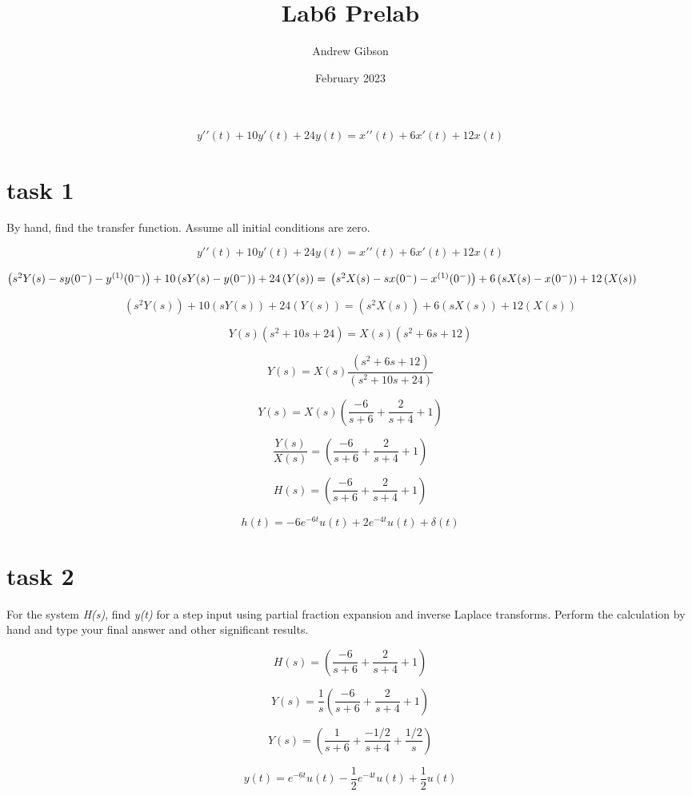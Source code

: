 \documentclass{article}
\title{Lab6 Prelab}
\author{Andrew Gibson}
\date{February 2023}
\begin{document}
\maketitle

\[y\prime \prime (t) + 10y\prime(t) + 24y(t) = x\prime\prime(t) + 6x\prime(t) + 12x(t)\]

\section{task 1}
By hand, find the transfer function. Assume all initial conditions are zero.

\[y\prime \prime (t) + 10y\prime(t) + 24y(t) = x\prime\prime(t) + 6x\prime(t) + 12x(t)\]

\begin{math}
\left(s^2 Y(s) -s y(0^{-})-y^{(1)} (0^{-}) \right) + 10 \left(s Y(s) - y(0^{-}) \right) + 24 \left(Y(s) \right)  = \\
\left(s^2 X(s) -s x(0^{-})-x^{(1)} (0^{-}) \right) + 6\left(s X(s) - x(0^{-}) \right) + 12 \left(X(s) \right) 
\end{math}

\[\left(s^2 Y(s) \right) + 10 \left(s Y(s) \right) + 24 \left(Y(s) \right) = \left(s^2 X(s) \right) + 6\left(s X(s) \right) + 12 \left(X(s) \right)\]

\[Y(s) \left(s^2 + 10 s  + 24 \right) =  X(s) \left(s^2  + 6 s + 12 \right)\]

\[Y(s)  =  X(s) \frac{\left(s^2  + 6 s + 12 \right)} {\left(s^2 + 10 s  + 24 \right)}\]

\[Y(s)  =  X(s) \left( \frac {-6} {s+6} + \frac {2}{s+4} + 1\right)\]

\[\frac {Y(s)} {X(s)}  =  \left( \frac {-6} {s+6} + \frac {2}{s+4} + 1\right)\]

\[H(s)  =  \left( \frac {-6} {s+6} + \frac {2}{s+4} + 1\right)\]

\[h(t)  =  -6 e^{-6t} u(t) + 2 e^{-4t} u(t)+\delta (t)\]


\section{task 2}
For the system  \textit{H(s)}, find \textit{y(t)} for a step input using partial fraction expansion and inverse
Laplace transforms. Perform the calculation by hand and type your final answer and other
significant results.

\[H(s)  =  \left( \frac {-6} {s+6} + \frac {2}{s+4} + 1\right)\]

\[Y(s)  =  \frac {1}{s} \left( \frac {-6} {s+6} + \frac {2}{s+4} + 1\right)\]


\[Y(s)  =   \left( \frac {1} {s+6} + \frac {-1/2}{s+4} + \frac{1/2}{s}\right)\]


\[y(t)  =   e^{-6t} u(t) - \frac {1}{2} e^{-4t} u(t)+\frac {1}{2} u(t)\]
\end{document}
